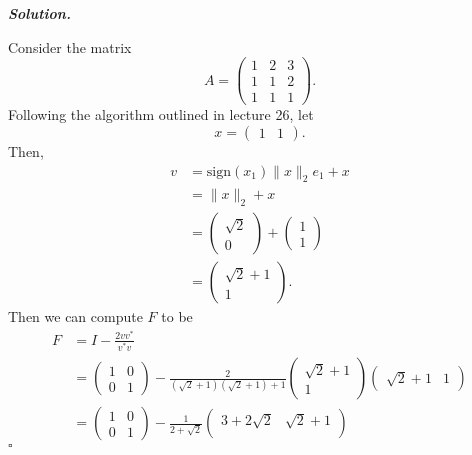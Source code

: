 \documentclass[12pt]{report}
\newenvironment{solution}[1][\it{Solution}]{\textbf{#1. } }{$\square$}
\begin{document}
\begin{solution}

    \noindent
    Consider the matrix
    \[ 
        A = \begin{pmatrix}
            1&2&3\\
            1&1&2\\
            1&1&1
        \end{pmatrix}.
    \]
    Following the algorithm outlined in lecture 26, let
    \[
    x = \begin{pmatrix}
        1 & 1
    \end{pmatrix}.
    \]
    Then,
    \begin{align*}
        v &= \text{sign}(x_1)\|x\|_2e_1 + x\\
        &= \|x\|_2 + x\\
        &= \begin{pmatrix}
            \sqrt{2}\\0
        \end{pmatrix} 
        +\begin{pmatrix}
            1\\1
        \end{pmatrix}\\
        &= \begin{pmatrix}
            \sqrt{2}+1\\1
        \end{pmatrix}.
    \end{align*}
    Then we can compute $F$ to be
    \begin{align*}
        F &= I - \frac{2vv^*}{v^*v}\\
        &=\begin{pmatrix}
            1&0\\0&1
        \end{pmatrix} - \frac{2}{(\sqrt{2}+1)(\sqrt{2}+1) + 1}\begin{pmatrix}
            \sqrt{2}+1\\1
        \end{pmatrix}\begin{pmatrix}
            \sqrt{2}+1&1
        \end{pmatrix}\\
        &=\begin{pmatrix}
            1&0\\0&1
        \end{pmatrix} - \frac{1}{2 + \sqrt{2}}\begin{pmatrix}
            3 + 2\sqrt{2} & \sqrt{2} + 1\\

\end{pmatrix}
\end{align*}
\end{solution}
\end{document}
